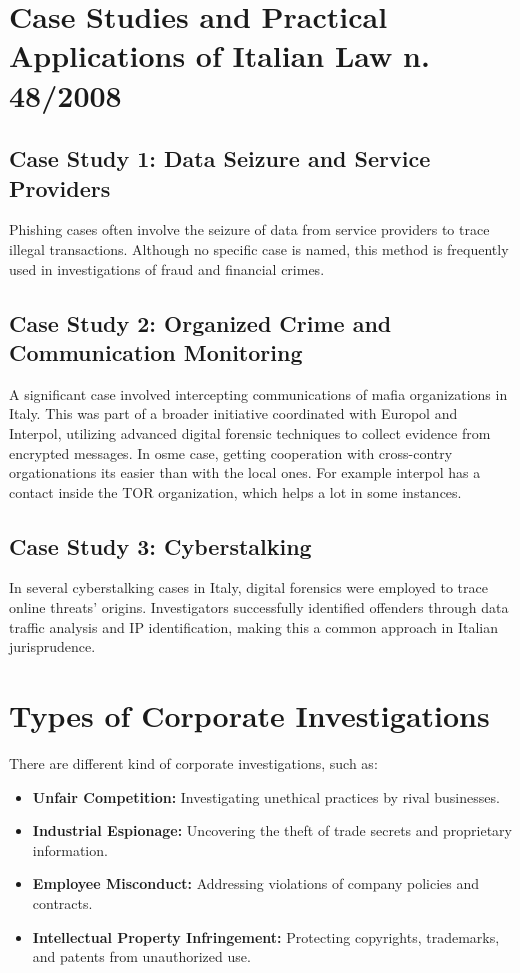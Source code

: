 \section{Case Studies and Practical Applications of Italian Law n. 48/2008}

\subsection{Case Study 1: Data Seizure and Service Providers}
Phishing cases often involve the seizure of data from service providers to
trace illegal transactions. Although no specific case is named, this method is
frequently used in investigations of fraud and financial crimes.

\subsection{Case Study 2: Organized Crime and Communication Monitoring}
A significant case involved intercepting communications of mafia organizations
in Italy. This was part of a broader initiative coordinated with Europol and
Interpol, utilizing advanced digital forensic techniques to collect evidence
from encrypted messages. In osme case, getting cooperation with cross-contry 
orgationations its easier than with the local ones. For example
interpol has a contact inside the TOR organization, which helps a lot
in some instances.

\subsection{Case Study 3: Cyberstalking}
In several cyberstalking cases in Italy, digital forensics were employed to
trace online threats' origins. Investigators successfully identified offenders
through data traffic analysis and IP identification, making this a common
approach in Italian jurisprudence.

\section{Types of Corporate Investigations}
There are different kind of corporate investigations, such as:
\begin{itemize}
    \item \textbf{Unfair Competition:} Investigating unethical practices by
      rival businesses.
    \item \textbf{Industrial Espionage:} Uncovering the theft of trade secrets
      and proprietary information.
    \item \textbf{Employee Misconduct:} Addressing violations of company
      policies and contracts.
    \item \textbf{Intellectual Property Infringement:} Protecting copyrights,
      trademarks, and patents from unauthorized use.
\end{itemize}

